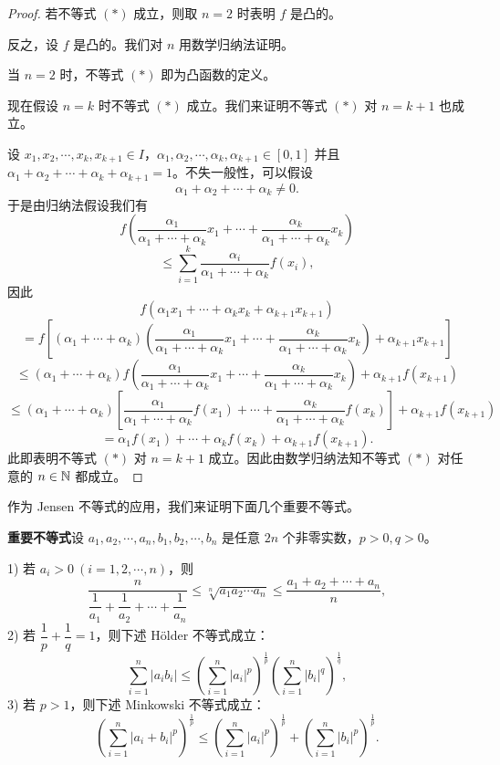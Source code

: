 \begin{proof}

	若不等式 \((*)\) 成立，则取 \(n=2\) 时表明 \(f\) 是凸的。

	反之，设 \(f\) 是凸的。我们对 \(n\) 用数学归纳法证明。

	当 \(n=2\) 时，不等式 \((*)\) 即为凸函数的定义。

	现在假设 \(n=k\) 时不等式 \((*)\) 成立。我们来证明不等式 \((*)\) 对 \(n=k+1\) 也成立。

	设 \(x_1,x_2,\cdots,x_k,x_{k+1}\in I\)，\(\alpha_1,\alpha_2,\cdots,\alpha_k,\alpha_{k+1}\in[0,1]\) 并且 \(\alpha_1+\alpha_2+\cdots+\alpha_k+\alpha_{k+1}=1\)。不失一般性，可以假设
	\[
	\alpha_1+\alpha_2+\cdots+\alpha_k\neq0.
	\]
	于是由归纳法假设我们有
	\[
	f\left(\frac{\alpha_1}{\alpha_1+\cdots+\alpha_k}x_1+\cdots+\frac{\alpha_k}{\alpha_1+\cdots+\alpha_k}x_k\right)
	\]
	\[
	\le\sum_{i=1}^k\frac{\alpha_i}{\alpha_1+\cdots+\alpha_k}f(x_i),
	\]
	因此
	\[
	f(\alpha_1x_1+\cdots+\alpha_kx_k+\alpha_{k+1}x_{k+1})
	\]
	\[
	=f\left[(\alpha_1+\cdots+\alpha_k)\left(\frac{\alpha_1}{\alpha_1+\cdots+\alpha_k}x_1+\cdots+\frac{\alpha_k}{\alpha_1+\cdots+\alpha_k}x_k\right)+\alpha_{k+1}x_{k+1}\right]
	\]
	\[
	\le(\alpha_1+\cdots+\alpha_k)f\left(\frac{\alpha_1}{\alpha_1+\cdots+\alpha_k}x_1+\cdots+\frac{\alpha_k}{\alpha_1+\cdots+\alpha_k}x_k\right)+\alpha_{k+1}f(x_{k+1})
	\]
	\[
	\le(\alpha_1+\cdots+\alpha_k)\left[\frac{\alpha_1}{\alpha_1+\cdots+\alpha_k}f(x_1)+\cdots+\frac{\alpha_k}{\alpha_1+\cdots+\alpha_k}f(x_k)\right]+\alpha_{k+1}f(x_{k+1})
	\]
	\[
	=\alpha_1f(x_1)+\cdots+\alpha_kf(x_k)+\alpha_{k+1}f(x_{k+1}).
	\]
	此即表明不等式 \((*)\) 对 \(n=k+1\) 成立。因此由数学归纳法知不等式 \((*)\) 对任意的 \(n\in\mathbb{N}\) 都成立。

\end{proof}

作为 Jensen 不等式的应用，我们来证明下面几个重要不等式。

\textbf{重要不等式}\quad 设 \(a_1,a_2,\cdots,a_n,b_1,b_2,\cdots,b_n\) 是任意 \(2n\) 个非零实数，\(p>0,q>0\)。

1) 若 \(a_i>0\ (i=1,2,\cdots,n)\)，则
\[
\frac{n}{\dfrac1{a_1}+\dfrac1{a_2}+\cdots+\dfrac1{a_n}}\le\sqrt[n]{a_1a_2\cdots a_n}\le\frac{a_1+a_2+\cdots+a_n}{n},
\]
2) 若 \(\dfrac1p+\dfrac1q=1\)，则下述 Hölder 不等式成立：
\[
\sum_{i=1}^n|a_ib_i|\le\left(\sum_{i=1}^n|a_i|^p\right)^{\frac1p}\left(\sum_{i=1}^n|b_i|^q\right)^{\frac1q},
\]
3) 若 \(p>1\)，则下述 Minkowski 不等式成立：
\[
\left(\sum_{i=1}^n|a_i+b_i|^p\right)^{\frac1p}\le\left(\sum_{i=1}^n|a_i|^p\right)^{\frac1p}+\left(\sum_{i=1}^n|b_i|^p\right)^{\frac1p}.
\]


